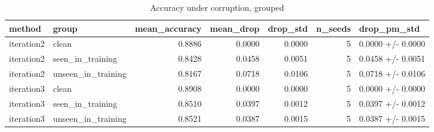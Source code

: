 \begin{table}
\caption{Accuracy under corruption, grouped}
\begin{tabular}{llrrrrl}
\toprule
method & group & mean\_accuracy & mean\_drop & drop\_std & n\_seeds & drop\_pm\_std \\
\midrule
iteration2 & clean & 0.8886 & 0.0000 & 0.0000 & 5 & 0.0000 +/- 0.0000 \\
iteration2 & seen\_in\_training & 0.8428 & 0.0458 & 0.0051 & 5 & 0.0458 +/- 0.0051 \\
iteration2 & unseen\_in\_training & 0.8167 & 0.0718 & 0.0106 & 5 & 0.0718 +/- 0.0106 \\
iteration3 & clean & 0.8908 & 0.0000 & 0.0000 & 5 & 0.0000 +/- 0.0000 \\
iteration3 & seen\_in\_training & 0.8510 & 0.0397 & 0.0012 & 5 & 0.0397 +/- 0.0012 \\
iteration3 & unseen\_in\_training & 0.8521 & 0.0387 & 0.0015 & 5 & 0.0387 +/- 0.0015 \\
\bottomrule
\end{tabular}
\end{table}
